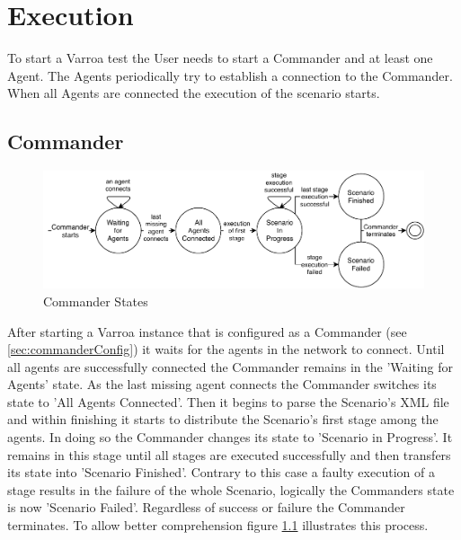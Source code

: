 \chapter{Execution}
To start a Varroa test the User needs to start a Commander and at least one Agent.
The Agents periodically try to establish a connection to the Commander.
When all Agents are connected the execution of the scenario starts.

\section{Commander}
\begin{figure}[H]
	\begin{center}
	\includegraphics[scale=0.9]{Resources/PDF/CommanderStates}
	\caption{Commander States}
	\label{pic:CommanderStates}
	\end{center}
\end{figure}
After starting a Varroa instance that is configured as a Commander (see \ref{sec:commanderConfig}) it waits for the agents in the network to connect.
Until all agents are successfully connected the Commander remains in the 'Waiting for Agents' state.
As the last missing agent connects the Commander switches its state to 'All Agents Connected'.
Then it begins to parse the Scenario's XML file and within finishing it starts to distribute the Scenario's first stage among the agents.
In doing so the Commander changes its state to 'Scenario in Progress'.
It remains in this stage until all stages are executed successfully and then transfers its state into 'Scenario Finished'.
Contrary to this case a faulty execution of a stage results in the failure of the whole Scenario, logically the Commanders state is now 'Scenario Failed'.
Regardless of success or failure the Commander terminates.
To allow better comprehension figure \ref{pic:CommanderStates} illustrates this process.


